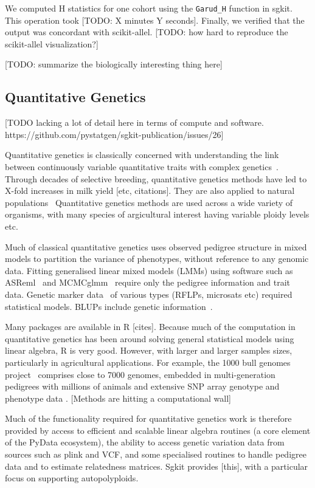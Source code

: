 \documentclass[a4paper,num-refs]{oup-contemporary}
\newcommand{\sgapi}[1]{\texttt{#1}}
\begin{document}
We computed H statistics for one cohort using the \sgapi{Garud\_H} function in sgkit.
This operation took [TODO: X minutes Y seconds]. Finally, we verified that the
output was concordant with scikit-allel. [TODO: how hard to reproduce the
scikit-allel visualization?]

[TODO: summarize the biologically interesting thing here]

\subsection{Quantitative Genetics}
[TODO lacking a lot of detail here in terms of compute and software.
https://github.com/pystatgen/sgkit-publication/issues/26]

Quantitative genetics is classically concerned with understanding
the link between continuously variable quantitative traits
with complex genetics~\citep{hill2010understanding}.
Through decades of selective breeding, quantitative genetics methods have
led to X-fold increases in milk yield [etc, citations].
They are also applied to
natural populations~\citep{wilson2010ecologist}
Quantitative genetics methods are used across a wide variety of
organisms, with many species of argicultural interest having
variable ploidy levels etc.

Much of classical quantitative genetics uses observed pedigree structure
in mixed models to partition the variance of phenotypes, without
reference to any genomic data.
Fitting generalised linear mixed models (LMMs) using
software such as ASReml~\citep{butler2009asreml}
and MCMCglmm~\citep{hadfield2010mcmc} require only the pedigree
information and trait data.
Genetic marker data~\citep{bernardo2008molecular} of various
types (RFLPs, microsats etc) required statistical models.
BLUPs include genetic information~\citep{endelman2011ridge}.

Many packages are available in R [cites]. Because much of the computation
in quantitative genetics has been around solving
general statistical models using linear algebra, R is very good.
However, with larger and larger samples sizes, particularly
in agricultural applications.
For example,
the 1000 bull genomes project~\citep{hayes20191000}
comprises close to 7000 genomes, embedded in multi-generation pedigrees
with millions of animals and extensive SNP array genotype and phenotype
data \citep[e.g.][]{cesarani2022mulibreed}.
[Methods are hitting a computational wall]

Much of the functionality required for quantitative genetics work
is therefore provided by access to efficient and scalable linear algebra
routines (a core element of the PyData ecosystem), the ability
to access genetic variation data from sources such as plink and VCF,
and some specialised routines to handle pedigree data and to
estimate relatedness matrices. Sgkit provides [this], with a particular
focus on supporting autopolyploids.
\end{document}
